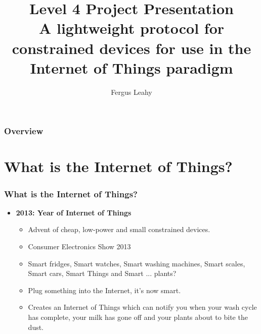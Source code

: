 \documentclass{beamer}
\title{Level 4 Project Presentation \\ A lightweight protocol for constrained devices for use in the Internet of
Things paradigm}
\author{Fergus Leahy}
\begin{document}
\maketitle


\begin{frame}
  \frametitle{Overview}
  \tableofcontents{}
\end{frame}


\section{What is the Internet of Things?} %
  \label{sec:introduction}
  \begin{frame}[t]\frametitle{What is the Internet of Things?}
  	\begin{itemize}
      \item<2->[--] \textbf{2013: Year of Internet of Things}
      \begin{itemize}
        \item Advent of cheap, low-power and small constrained devices.
        \item Consumer Electronics Show 2013
        \item Smart fridges, Smart watches, Smart washing machines, Smart scales, Smart cars, Smart Things and Smart ... plants?
        \item Plug something into the Internet, it's now smart.
        \item Creates an Internet of Things which can notify you when your wash cycle has complete, your milk has gone off and your plants about to bite the dust.
      \end{itemize}
    \end{itemize}
\end{frame}
\end{document}
